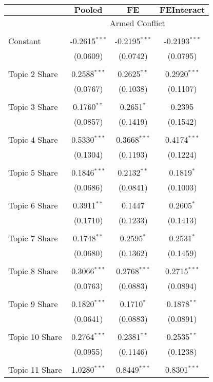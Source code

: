 \begin{center}
\begin{tabular}{lccc}
\\[-1.8ex]\hline
& $\textbf{Pooled}$& $\textbf{FE}$& $\textbf{FEInteract}$\\
 \hline \hline 
& \multicolumn{3}{c}{Armed Conflict} \\
\hline \\[-1.8ex]
Constant & -0.2615$^{***}$ & -0.2195$^{***}$ & -0.2193$^{***}$ \\
 & (0.0609)& (0.0742)& (0.0795)\\ 
\\Topic 2 Share & 0.2588$^{***}$ & 0.2625$^{**}$ & 0.2920$^{***}$ \\
 & (0.0767)& (0.1038)& (0.1107)\\ 
\\Topic 3 Share & 0.1760$^{**}$ & 0.2651$^{*}$ & 0.2395 \\
 & (0.0857)& (0.1419)& (0.1542)\\ 
\\Topic 4 Share & 0.5330$^{***}$ & 0.3668$^{***}$ & 0.4174$^{***}$ \\
 & (0.1304)& (0.1193)& (0.1224)\\ 
\\Topic 5 Share & 0.1846$^{***}$ & 0.2132$^{**}$ & 0.1819$^{*}$ \\
 & (0.0686)& (0.0841)& (0.1003)\\ 
\\Topic 6 Share & 0.3911$^{**}$ & 0.1447 & 0.2605$^{*}$ \\
 & (0.1710)& (0.1233)& (0.1413)\\ 
\\Topic 7 Share & 0.1748$^{**}$ & 0.2595$^{*}$ & 0.2531$^{*}$ \\
 & (0.0680)& (0.1362)& (0.1459)\\ 
\\Topic 8 Share & 0.3066$^{***}$ & 0.2768$^{***}$ & 0.2715$^{***}$ \\
 & (0.0763)& (0.0883)& (0.0894)\\ 
\\Topic 9 Share & 0.1820$^{***}$ & 0.1710$^{*}$ & 0.1878$^{**}$ \\
 & (0.0641)& (0.0883)& (0.0891)\\ 
\\Topic 10 Share & 0.2764$^{***}$ & 0.2381$^{**}$ & 0.2535$^{**}$ \\
 & (0.0955)& (0.1146)& (0.1238)\\ 
\\Topic 11 Share & 1.0280$^{***}$ & 0.8449$^{***}$ & 0.8301$^{***}$ \\

\end{tabular}
\end{center}
